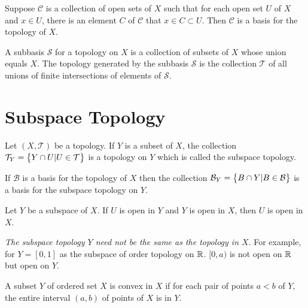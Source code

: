 \begin{theorem}
    Suppose $\mathcal{C}$ is a collection of open sets of $X$ such that for each open set $U$ of $X$ and $x \in U$, there is an element $C$ of $\mathcal{C}$ that $x \in C \subset U$. Then $\mathcal{C}$ is a basis for the topology of $X$.    
\end{theorem}


\begin{definition}
    A subbasis $\mathcal{S}$ for a topology on $X$ is a collection of subsets of $X$ whose union equals $X$. The topology generated by the subbasis $\mathcal{S}$ is the collection $\mathcal{T}$ of all unions of finite intersections of elements of $\mathcal{S}$.
\end{definition}


\section{Subspace Topology}

\begin{definition}
    Let $(X, \mathcal{T})$ be a topology. If $Y$ is a subset of $X$, the collection $\mathcal{T}_{Y} = \set{Y \cap U | U \in \mathcal{T}}$ is a topology on $Y$ which is called the subspace topology.
\end{definition}

\begin{theorem}
    If $\mathcal{B}$ is a basis for the topology of $X$ then the collection $\mathcal{B}_Y = \set{B \cap Y | B \in \mathcal{B}}$ is a basis for the subspace topology on $Y$.
\end{theorem}

\begin{theorem}
    Let $Y$ be a subspace of $X$. If $U$ is open in $Y$ and $Y$ is open in $X$, then $U$ is open in $X$.    
\end{theorem}

\emph{The subspace topology $Y$ need not be the same as the topology in $X$}. For example, for $Y=[0,1]$ as the subspace of order topology on $\mathbb{R}$. $[0,a)$ is not open on $\mathbb{R}$ but open on $Y$.


\begin{theorem}
    A subset $Y$ of ordered set $X$ is convex in $X$ if for each pair of points $a < b$ of $Y$, the entire interval $(a,b)$ of points of $X$ is in $Y$.     
\end{theorem}

